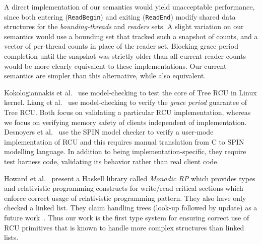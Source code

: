  A direct implementation of our semantics would yield unacceptable performance, since both entering (\lstinline|ReadBegin|) and exiting (\lstinline|ReadEnd|) modify shared data structures for the \textit{bounding-threads} and \textit{readers} sets. A slight variation on our semantics would use a bounding set  that tracked such a snapshot of counts, and a vector of per-thread counts in place of the reader set. Blocking grace period completion until the snapshot was strictly older than all current reader counts would be more clearly equivalent to these implementations. Our current semantics are simpler than this alternative, while also equivalent. 

 Kokologiannakis et al.~\cite{Kokologiannakis:2017:SMC:3092282.3092287} use model-checking to test the core of \textsf{Tree RCU} in Linux kernel. Liang et al.~\cite{LiangMKM16} use model-checking to verify the \emph{grace period} guarantee of \textsf{Tree RCU}. Both focus on validating a particular RCU implementation, whereas we focus on verifying memory safety of clients independent of implementation. Desnoyers et al.~\cite{urcu_ieee} use the \textsf{SPIN} model checker to verify a user-mode implementation of RCU and this requires manual translation from C to SPIN modelling language.
In addition to being implementation-specific, they require test harness code, validating its behavior rather than real client code.

Howard et al.~\cite{Howard:2011:RES:2001252.2001267,Cooper2015RelativisticPI} present a \textsf{Haskell} library called \emph{Monadic RP} which provides types and relativistic programming constructs for write/read critical sections which enforce correct usage of relativistic programming pattern. They also have only checked a linked list. They claim  handling trees (look-up followed by update) as a future work~\cite{Howard:2011:RES:2001252.2001267}. Thus our work is the first type system for ensuring correct use of RCU primitives that is known to handle more complex structures than linked lists.
